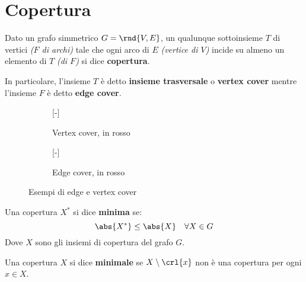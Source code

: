 \documentclass[\main/main.tex]{subfiles}
\begin{document}
\section{Copertura}
\begin{definition}[Copertura]
	Dato un grafo simmetrico \(G = \rnd{V, E}\), un qualunque sottoinsieme \(T\) di vertici \textit{(\(F\) di archi)} tale che ogni arco di \(E\) \textit{(vertice di \(V\))} incide su almeno un elemento di \(T\) \textit{(di \(F\))} si dice \textbf{copertura}.

	In particolare, l'insieme \(T\) è detto \textbf{insieme trasversale} o \textbf{vertex cover} mentre l'insieme \(F\) è detto \textbf{edge cover}.
	\begin{figure}
		\begin{subfigure}{0.49\textwidth}
			[-]
			\VertexCover{}
			\caption{Vertex cover, in rosso}
		\end{subfigure}
		\begin{subfigure}{0.49\textwidth}
			[-]
			\EdgeCover{}
			\caption{Edge cover, in rosso}
		\end{subfigure}
		\caption{Esempi di edge e vertex cover}
	\end{figure}
\end{definition}
\begin{definition}
	Una copertura \(X^*\) si dice \textbf{minima} se:
	\[\abs{X^*} \leq \abs{X} \quad \forall X \in G\]
	Dove \(X\) sono gli insiemi di copertura del grafo \(G\).
\end{definition}
\begin{definition}
	Una copertura \(X\) si dice \textbf{minimale} se \(X \setminus \crl{x}\) non è una copertura per ogni \(x \in X\).
\end{definition}
\clearpage
\end{document}
